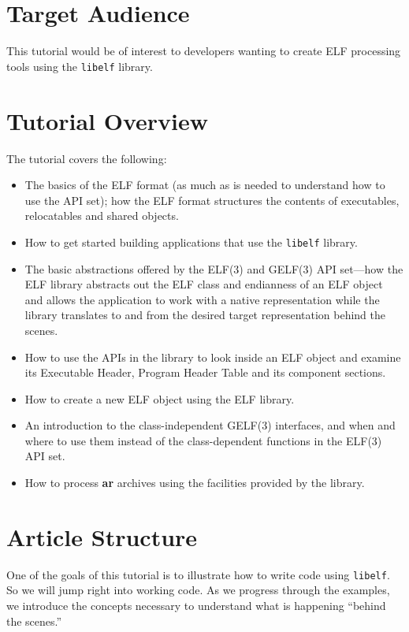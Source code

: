 \documentclass[a4paper]{report}
\newcommand{\library}[1]{\texttt{#1}}
\newcommand{\tool}[1]{\textbf{#1}}
\begin{document}
\section*{Target Audience}
This tutorial would be of interest to developers wanting to create ELF
processing tools using the \library{libelf} library.

\section{Tutorial Overview}
The tutorial covers the following:

\begin{itemize}
\item The basics of the ELF format (as much as is needed to understand
  how to use the API set); how the ELF format structures the contents
  of executables, relocatables and shared objects.
\item How to get started building applications that use the
  \library{libelf} library.
\item The basic abstractions offered by the ELF(3) and GELF(3) API
  set---how the ELF library abstracts out the ELF class and endianness
  of an ELF object and allows the application to work with a native
  representation while the library translates to and from the desired
  target representation behind the scenes.
\item How to use the APIs in the library to look inside an ELF object and examine its Executable Header, Program
  Header Table and its component sections.
\item How to create a new ELF object using the ELF library.
\item An introduction to the class-independent GELF(3) interfaces, and when and where to use them
 instead of the class-dependent functions in the ELF(3) API set.
\item How to process \tool{ar} archives using the facilities provided by the library.
\end{itemize}

\section{Article Structure}
One of the goals of this tutorial is to illustrate how to write code
using \library{libelf}.  So we will jump right into working code.  As
we progress through the examples, we introduce the concepts necessary
to understand what is happening ``behind the scenes.''
\end{document}
